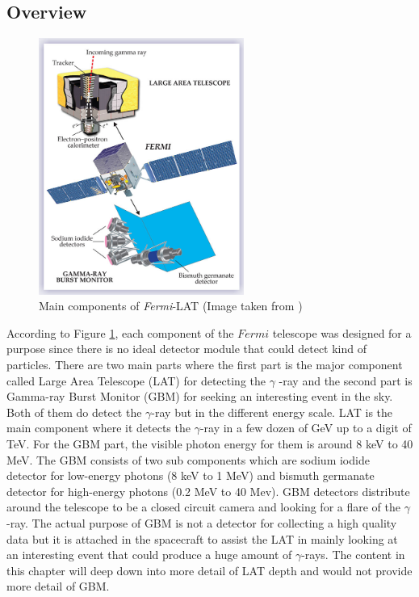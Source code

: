 \subsection{Overview}

\begin{figure}[h!]
    \centering
    \includegraphics[width=0.6\textwidth]{content/background/figures/fermi_instrument.jpeg}
    \caption{Main components of \textit{Fermi}-LAT (Image taken from \cite{fermi_lat_instrument_first_year})}
    \label{fig:fermi_main_components}
\end{figure}
According to Figure \ref{fig:fermi_main_components},
each component of the $Fermi$ telescope was designed for a purpose since there 
is no ideal detector module that could detect kind of particles.
There are two main parts where the first part is the major component 
called Large Area Telescope (LAT) for detecting the $\gamma$
-ray and the second part is Gamma-ray Burst Monitor (GBM) for seeking 
an interesting event in the sky. Both of them do detect 
the $\gamma$-ray but in the different energy scale. LAT is the main 
component where it detects the $\gamma$-ray in a few dozen of GeV 
up to a digit of TeV. For the GBM part, the visible photon energy 
for them is around 8 keV to 40 MeV. The GBM consists of two 
sub components which are sodium iodide detector for low-energy photons
(8 keV to 1 MeV) and bismuth germanate detector for high-energy photons 
(0.2 MeV to 40 Mev). GBM detectors distribute around 
the telescope to be a closed circuit camera and looking for a flare 
of the $\gamma$-ray. The actual purpose of GBM is not a detector 
for collecting a high quality data but it is attached in the spacecraft 
to assist the LAT in mainly looking at an interesting event that could 
produce a huge amount of $\gamma$-rays. The content in this chapter 
will deep down into more detail of LAT depth and would not provide 
more detail of GBM.

